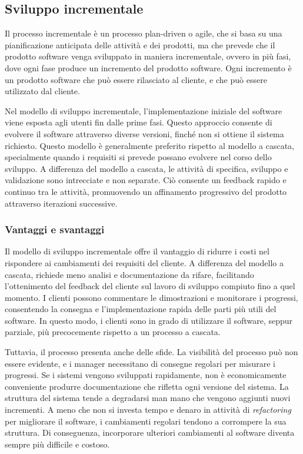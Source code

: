 \subsection{Sviluppo incrementale}
Il processo incrementale è un processo plan-driven o agile, che si basa su una pianificazione
anticipata delle attività e dei prodotti, ma che prevede che il prodotto software
venga sviluppato in maniera incrementale, ovvero in più fasi, dove ogni fase
produce un incremento del prodotto software. Ogni incremento è un prodotto software
che può essere rilasciato al cliente, e che può essere utilizzato dal cliente. 

Nel modello di sviluppo incrementale, l'implementazione iniziale del software viene esposta
agli utenti fin dalle prime fasi. Questo approccio consente di evolvere il software
attraverso diverse versioni, finché non si ottiene il sistema richiesto.
Questo modello è generalmente preferito rispetto al modello a cascata,
specialmente quando i requisiti si prevede possano evolvere nel corso dello sviluppo.
A differenza del modello a cascata, le attività di specifica, sviluppo e validazione
sono intrecciate e non separate. Ciò consente un feedback rapido e continuo tra le
attività, promuovendo un affinamento progressivo del prodotto attraverso iterazioni
successive.
\subsubsection{Vantaggi e svantaggi}

Il modello di sviluppo incrementale offre il vantaggio di ridurre i costi
nel rispondere ai cambiamenti dei requisiti del cliente. A differenza del
modello a cascata, richiede meno analisi e documentazione da rifare, facilitando
l'ottenimento del feedback del cliente sul lavoro di sviluppo compiuto fino a quel
momento. I clienti possono commentare le dimostrazioni e monitorare i progressi,
consentendo la consegna e l'implementazione rapida delle parti più utili del software.
In questo modo, i clienti sono in grado di utilizzare il software, seppur parziale,
più precocemente rispetto a un processo a cascata.

Tuttavia, il processo presenta anche delle sfide. La visibilità del processo può
non essere evidente, e i manager necessitano di consegne regolari per misurare i
progressi. Se i sistemi vengono sviluppati rapidamente, non è economicamente conveniente
produrre documentazione che rifletta ogni versione del sistema. La struttura del sistema
tende a degradarsi man mano che vengono aggiunti nuovi incrementi. A meno che non si
investa tempo e denaro in attività di \textit{refactoring} per migliorare il software,
i cambiamenti regolari tendono a corrompere la sua struttura. Di conseguenza,
incorporare ulteriori cambiamenti al software diventa sempre più difficile e costoso.

